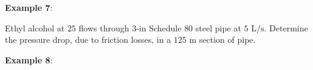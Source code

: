 \documentclass[10pt]{amsart}
\begin{document}
\begin{multicols}{2}
\vfill\newpage
	\textbf{Example 7}:
	
	Ethyl alcohol at $25$\textcelsius{} flows through $3\text{-in}$ Schedule $80$ steel pipe at
	$5\text{ L/s}$. Determine the pressure drop, due to friction losses, in a $125\text{ m}$ section of pipe.

% 	
% 	
% 	
% 	
\vfill\pagebreak
	
	\textbf{Example 8}:
	

\end{multicols}
\end{document}
